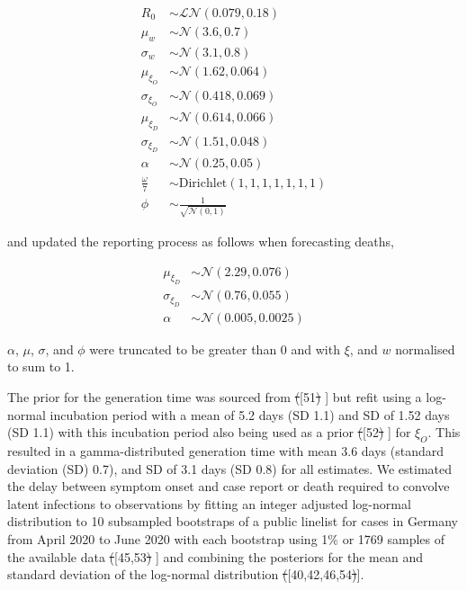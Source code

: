 \documentclass[10pt,letterpaper]{article} %
\providecommand{\DIFdeltex}[1]{{\protect\color{red}\sout{#1}}}                      %
\providecommand{\DIFaddbegin}{} %
\providecommand{\DIFaddend}{} %
\providecommand{\DIFdelbegin}{} %
\providecommand{\DIFdelend}{} %
\providecommand{\DIFdel}[1]{\texorpdfstring{\DIFdeltex{#1}}{}} %
\newcommand{\DIFscaledelfig}{0.5}
\newlength{\DIFdelgraphicswidth} %
\newlength{\DIFdelgraphicsheight} %
\newcommand{\DIFaddincludegraphics}[2][]{{\color{blue}\fbox{\DIFOincludegraphics[#1]{#2}}}} %
\newcommand{\DIFdelincludegraphics}[2][]{%
\sbox{\DIFdelgraphicsbox}{\DIFOincludegraphics[#1]{#2}}%
\settoboxwidth{\DIFdelgraphicswidth}{\DIFdelgraphicsbox} %
\settoboxtotalheight{\DIFdelgraphicsheight}{\DIFdelgraphicsbox} %
\scalebox{\DIFscaledelfig}{%
\parbox[b]{\DIFdelgraphicswidth}{\usebox{\DIFdelgraphicsbox}\\[-\baselineskip] \rule{\DIFdelgraphicswidth}{0em}}\llap{\resizebox{\DIFdelgraphicswidth}{\DIFdelgraphicsheight}{%
\setlength{\unitlength}{\DIFdelgraphicswidth}%
\begin{picture}(1,1)%
\thicklines\linethickness{2pt} %
{\color[rgb]{1,0,0}\put(0,0){\framebox(1,1){}}}%
{\color[rgb]{1,0,0}\put(0,0){\line( 1,1){1}}}%
{\color[rgb]{1,0,0}\put(0,1){\line(1,-1){1}}}%
\end{picture}%
}\hspace*{3pt}}} %
} %
\DeclareRobustCommand{\DIFaddbegin}{\DIFOaddbegin \let\includegraphics\DIFaddincludegraphics} %
\DeclareRobustCommand{\DIFaddend}{\DIFOaddend \let\includegraphics\DIFOincludegraphics} %
\DeclareRobustCommand{\DIFdelbegin}{\DIFOdelbegin \let\includegraphics\DIFdelincludegraphics} %
\DeclareRobustCommand{\DIFdelend}{\DIFOaddend \let\includegraphics\DIFOincludegraphics} %
\begin{document}
\begin{align}
     R_0 &\sim \mathcal{LN}(0.079, 0.18) \\
    \mu_w &\sim \mathcal{N}(3.6, 0.7) \\
    \sigma_w &\sim \mathcal{N}(3.1, 0.8) \\
    \mu_{\xi_{O}} &\sim \mathcal{N}(1.62, 0.064) \\
    \sigma_{\xi_{O}} &\sim \mathcal{N}(0.418, 0.069) \\
    \mu_{\xi_{D}} &\sim \mathcal{N}(0.614, 0.066) \\
    \sigma_{\xi_{D}} &\sim \mathcal{N}(1.51, 0.048) \\
    \alpha &\sim \mathcal{N}(0.25, 0.05) \\
    \frac{\omega}{7} &\sim \mathrm{Dirichlet}(1, 1, 1, 1, 1, 1, 1) \\
    \phi &\sim \frac{1}{\sqrt{\mathcal{N}(0, 1)}}
\end{align}

and updated the reporting process as follows when forecasting deaths,

\begin{align}
    \mu_{\xi_{D}} &\sim \mathcal{N}(2.29, 0.076) \\
    \sigma_{\xi_{D}} &\sim \mathcal{N}(0.76, 0.055) \\
    \alpha &\sim \mathcal{N}(0.005, 0.0025) 
\end{align}

\(\alpha\), \(\mu\), \(\sigma\), and \(\phi\) were truncated to be
greater than 0 and with \(\xi\), and \(w\) normalised to sum to 1.

The prior for the generation time was sourced from \DIFdelbegin \DIFdel{(}\DIFdelend \DIFaddbegin {[}\DIFaddend 51\DIFdelbegin \DIFdel{) }\DIFdelend \DIFaddbegin {]} \DIFaddend but refit
using a log-normal incubation period with a mean of 5.2 days (SD 1.1)
and SD of 1.52 days (SD 1.1) with this incubation period also being used
as a prior \DIFdelbegin \DIFdel{(}\DIFdelend \DIFaddbegin {[}\DIFaddend 52\DIFdelbegin \DIFdel{) }\DIFdelend \DIFaddbegin {]} \DIFaddend for \(\xi_{O}\). This resulted in a
gamma-distributed generation time with mean 3.6 days (standard deviation
(SD) 0.7), and SD of 3.1 days (SD 0.8) for all estimates. We estimated
the delay between symptom onset and case report or death required to
convolve latent infections to observations by fitting an integer
adjusted log-normal distribution to 10 subsampled bootstraps of a public
linelist for cases in Germany from April 2020 to June 2020 with each
bootstrap using 1\% or 1769 samples of the available data \DIFdelbegin \DIFdel{(}\DIFdelend \DIFaddbegin {[}\DIFaddend 45,53\DIFdelbegin \DIFdel{) }\DIFdelend \DIFaddbegin {]}
\DIFaddend and combining the posteriors for the mean and standard deviation of the
log-normal distribution \DIFdelbegin \DIFdel{(}\DIFdelend \DIFaddbegin {[}\DIFaddend 40,42,46,54\DIFdelbegin \DIFdel{)}\DIFdelend \DIFaddbegin {]}\DIFaddend .
\end{document}
